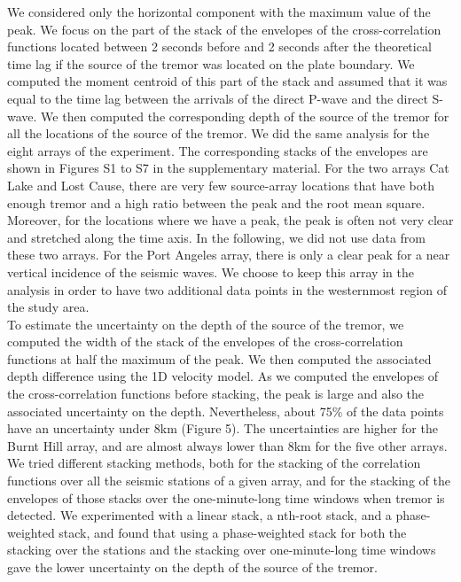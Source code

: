 \documentclass[draft]{agujournal2019}
\begin{document}
We considered only the horizontal component with the maximum value of the peak. We focus on the part of the stack of the envelopes of the cross-correlation functions located between 2 seconds before and 2 seconds after the theoretical time lag if the source of the tremor was located on the plate boundary. We computed the moment centroid of this part of the stack and assumed that it was equal to the time lag between the arrivals of the direct P-wave and the direct S-wave. We then computed the corresponding depth of the source of the tremor for all the locations of the source of the tremor. We did the same analysis for the eight arrays of the experiment. The corresponding stacks of the envelopes are shown in Figures S1 to S7 in the supplementary material. For the two arrays Cat Lake and Lost Cause, there are very few source-array locations that have both enough tremor and a high ratio between the peak and the root mean square. Moreover, for the locations where we have a peak, the peak is often not very clear and stretched along the time axis. In the following, we did not use data from these two arrays. For the Port Angeles array, there is only a clear peak for a near vertical incidence of the seismic waves. We choose to keep this array in the analysis in order to have two additional data points in the westernmost region of the study area. \\

To estimate the uncertainty on the depth of the source of the tremor, we computed the width of the stack of the envelopes of the cross-correlation functions at half the maximum of the peak. We then computed the associated depth difference using the 1D velocity model. As we computed the envelopes of the cross-correlation functions before stacking, the peak is large and also the associated uncertainty on the depth. Nevertheless, about 75\% of the data points have an uncertainty under 8km (Figure 5). The uncertainties are higher for the Burnt Hill array, and are almost always lower than 8km for the five other arrays. We tried different stacking methods, both for the stacking of the correlation functions over all the seismic stations of a given array, and for the stacking of the envelopes of those stacks over the one-minute-long time windows when tremor is detected. We experimented with a linear stack, a nth-root stack, and a phase-weighted stack, and found that using a phase-weighted stack for both the stacking over the stations and the stacking over one-minute-long time windows gave the lower uncertainty on the depth of the source of the tremor.
\end{document}
